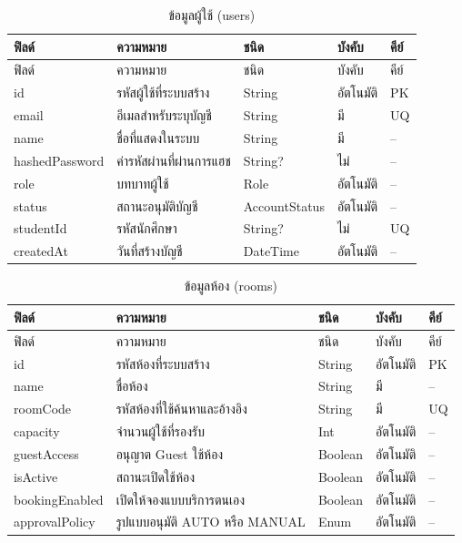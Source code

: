 \documentclass[14pt,a4paper,oneside]{extreport}
\begin{document}
{\small\setlength{\tabcolsep}{2pt}
\begin{longtable}{L{29mm}L{56mm}L{24mm}L{18mm}L{17mm}}
\caption{ข้อมูลผู้ใช้ (users)}\\\toprule ฟิลด์ & ความหมาย & ชนิด & บังคับ & คีย์\\\midrule\endfirsthead
\toprule ฟิลด์ & ความหมาย & ชนิด & บังคับ & คีย์\\\midrule\endhead
id & รหัสผู้ใช้ที่ระบบสร้าง & String & อัตโนมัติ & PK\\
email & อีเมลสำหรับระบุบัญชี & String & มี & UQ\\
name & ชื่อที่แสดงในระบบ & String & มี & --\\
hashedPassword & ค่ารหัสผ่านที่ผ่านการแฮช & String? & ไม่ & --\\
role & บทบาทผู้ใช้ & Role & อัตโนมัติ & --\\
status & สถานะอนุมัติบัญชี & AccountStatus & อัตโนมัติ & --\\
studentId & รหัสนักศึกษา & String? & ไม่ & UQ\\
createdAt & วันที่สร้างบัญชี & DateTime & อัตโนมัติ & --\\
\bottomrule\end{longtable}

\begin{longtable}{L{29mm}L{56mm}L{24mm}L{18mm}L{17mm}}
\caption{ข้อมูลห้อง (rooms)}\\\toprule ฟิลด์ & ความหมาย & ชนิด & บังคับ & คีย์\\\midrule\endfirsthead
\toprule ฟิลด์ & ความหมาย & ชนิด & บังคับ & คีย์\\\midrule\endhead
id & รหัสห้องที่ระบบสร้าง & String & อัตโนมัติ & PK\\
name & ชื่อห้อง & String & มี & --\\
roomCode & รหัสห้องที่ใช้ค้นหาและอ้างอิง & String & มี & UQ\\
capacity & จำนวนผู้ใช้ที่รองรับ & Int & อัตโนมัติ & --\\
guestAccess & อนุญาต Guest ใช้ห้อง & Boolean & อัตโนมัติ & --\\
isActive & สถานะเปิดใช้ห้อง & Boolean & อัตโนมัติ & --\\
bookingEnabled & เปิดให้จองแบบบริการตนเอง & Boolean & อัตโนมัติ & --\\
approvalPolicy & รูปแบบอนุมัติ AUTO หรือ MANUAL & Enum & อัตโนมัติ & --\\
\bottomrule\end{longtable}

}
\end{document}
